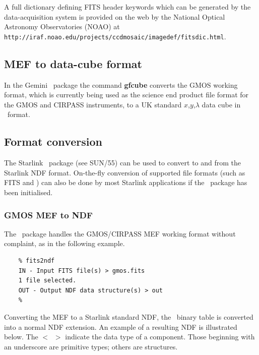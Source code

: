 \documentclass[twoside,11pt]{article}
\newcommand{\htmladdnormallink}[2]{#1}
\newcommand{\latex}[1]{#1}
\newcommand{\xref}[3]{#1}
\newcommand{\xlabel}[1]{}
\begin{document}
A full
\htmladdnormallink{dictionary}{http://iraf.noao.edu/projects/ccdmosaic/imagedef/fitsdic.html}
defining FITS header keywords which can be generated by the
data-acquisition system is provided on the web by the National Optical
Astronomy Observatories (NOAO)\latex{ at {\tt
http://iraf.noao.edu/projects/ccdmosaic/imagedef/fitsdic.html}}.
 
\subsection{\xlabel{sc16_mef2cub}MEF to data-cube format\label{sc16_mef2cub}}

In the Gemini \IRAF\ package the command {\bf gfcube} converts the
GMOS working format, which is currently being used as the science end
product file format for the GMOS and CIRPASS instruments, to a UK
standard $x$,$y$,$\lambda$ data cube in \FITSref\ format.

\subsection{\xlabel{sc16_converting}Format conversion\label{sc16_converting}}

The Starlink \CONVERTref\ package \latex{(see SUN/55)} can be used
to convert to and from the Starlink \xref{NDF}{sun33}{} format.
On-the-fly conversion of supported file formats (such as FITS and
\IRAF) can also be done by most Starlink applications if the \CONVERT\
package has been initialised.

\subsubsection{GMOS MEF to NDF}

The \CONVERTref\ package handles the GMOS/CIRPASS MEF
working format without complaint, as in the following example.

\begin{verbatim}
    % fits2ndf
    IN - Input FITS file(s) > gmos.fits
    1 file selected.
    OUT - Output NDF data structure(s) > out
    %
\end{verbatim}

Converting the MEF to a Starlink standard \xref{NDF}{sun33}{}, the
\FITSref\ binary table is converted into a normal NDF extension.  An
example of a resulting NDF is illustrated below.  The $<$~$>$ indicate
the data type of a component.  Those beginning with an underscore are
primitive types; others are structures.
\end{document}
